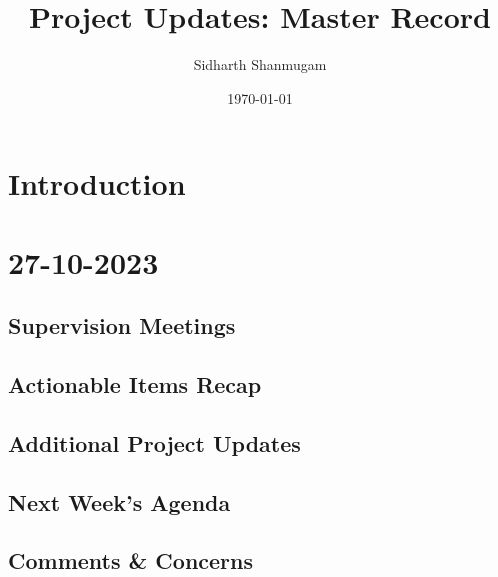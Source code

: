 \documentclass[11pt]{update}
\title{Project Updates: Master Record}
\author{Sidharth Shanmugam}
\date{\today}
\begin{document}
\maketitle	
\pagebreak

\tableofcontents
\pagebreak

\section*{Introduction}

\pagebreak

\section{27-10-2023}
\subsection{Supervision Meetings}

\subsection{Actionable Items Recap}

\subsection{Additional Project Updates}

\subsection{Next Week's Agenda}

\subsection{Comments \& Concerns}

\pagebreak
\end{document}
